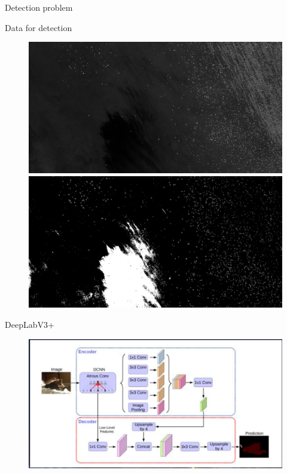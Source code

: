 \documentclass{beamer}
\begin{document}
\begin{section}{Detection problem}
\begin{frame}{Data for detection}
\begin{itemize}
		\begin{figure}
			\centering
			\begin{minipage}{0.5\textwidth}
			\includegraphics[scale=0.1]{maxar_8thAugust_1_26_28.png}
			\end{minipage}%
		    \begin{minipage}{0.5\textwidth}
		    \includegraphics[scale=0.1]{maxar_8thAugust_1_26_28_mask.png}
		    \end{minipage}
	    \end{figure}
	
	\end{itemize}
	\end{frame}

\begin{frame}{DeepLabV3+}
\begin{figure}[H]
\centering
\includegraphics[scale=0.25]{deeplabv3plus.png}
\end{figure}
\end{frame}


\end{section}
\end{document}
